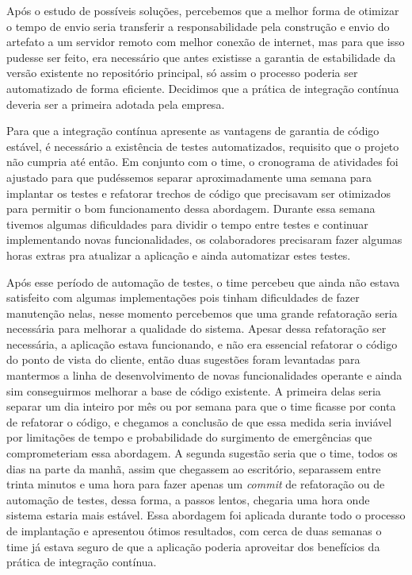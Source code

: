 \documentclass[
	12pt,				%
	openright,			%
	oneside,			%
	a4paper,			%
	english,			%
	french,				%
	spanish,			%
	brazil,				%
	]{abntex2}
\begin{document}
Após o estudo de possíveis soluções, percebemos que a melhor forma de otimizar o tempo de envio seria transferir a responsabilidade pela construção e envio do artefato a um servidor remoto com melhor conexão de internet, mas para que isso pudesse ser feito, era necessário que antes existisse a garantia de estabilidade da versão existente no repositório principal, só assim o processo poderia ser automatizado de forma eficiente. Decidimos que a prática de integração contínua deveria ser a primeira adotada pela empresa.

Para que a integração contínua apresente as vantagens de garantia de código estável, é necessário a existência de testes automatizados, requisito que o projeto não cumpria até então. Em conjunto com o time, o cronograma de atividades foi ajustado para que pudéssemos separar aproximadamente uma semana para implantar os testes e refatorar trechos de código que precisavam ser otimizados para permitir o bom funcionamento dessa abordagem. Durante essa semana tivemos algumas dificuldades para dividir o tempo entre testes e continuar implementando novas funcionalidades, os colaboradores precisaram fazer algumas horas extras pra atualizar a aplicação e ainda automatizar estes testes.

Após esse período de automação de testes, o time percebeu que ainda não estava satisfeito com algumas implementações pois tinham dificuldades de fazer manutenção nelas, nesse momento percebemos que uma grande refatoração seria necessária para melhorar a qualidade do sistema. Apesar dessa refatoração ser necessária, a aplicação estava funcionando, e não era essencial refatorar o código do ponto de vista do cliente, então duas sugestões foram levantadas para mantermos a linha de desenvolvimento de novas funcionalidades operante e ainda sim conseguirmos melhorar a base de código existente. A primeira delas seria separar um dia inteiro por mês ou por semana para que o time ficasse por conta de refatorar o código, e chegamos a conclusão de que essa medida seria inviável por limitações de tempo e probabilidade do surgimento de emergências que comprometeriam essa abordagem. A segunda sugestão seria que o time, todos os dias na parte da manhã, assim que chegassem ao escritório, separassem entre trinta minutos e uma hora para fazer apenas um \textit{commit} de refatoração ou de automação de testes, dessa forma, a passos lentos, chegaria uma hora onde sistema estaria mais estável. Essa abordagem foi aplicada durante todo o processo de implantação e apresentou ótimos resultados, com cerca de duas semanas o time já estava seguro de que a aplicação poderia aproveitar dos benefícios da prática de integração contínua.
\end{document}
